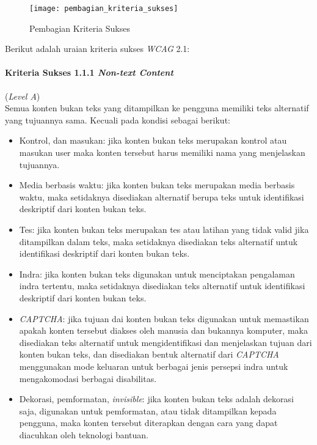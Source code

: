 \begin{figure}[H]
	\centering  
	\texttt{[image: pembagian\_kriteria\_sukses]}  
	\caption[Pembagian Kriteria Sukses]{Pembagian Kriteria Sukses} 
	\label{fig:pembagian_kriteria_sukses} 
\end{figure}

Berikut adalah uraian kriteria sukses \textit{WCAG} 2.1:

\paragraph{Kriteria Sukses 1.1.1 \textit{Non-text Content}}
\label{subsec:kriteria_1.1.1}
(\textit{Level A})\\

Semua konten bukan teks yang ditampilkan ke pengguna memiliki teks alternatif yang tujuannya sama. Kecuali pada kondisi sebagai berikut:

\begin{itemize}
	\item Kontrol, dan masukan: jika konten bukan teks merupakan kontrol atau masukan user maka konten tersebut harus memiliki nama yang menjelaskan tujuannya.
	\item Media berbasis waktu: jika konten bukan teks merupakan media berbasis waktu, maka setidaknya disediakan alternatif berupa teks untuk identifikasi deskriptif dari konten bukan teks.
	\item Tes: jika konten bukan teks merupakan tes atau latihan yang tidak valid jika ditampilkan dalam teks, maka setidaknya disediakan teks alternatif untuk identifikasi deskriptif dari konten bukan teks.
	\item Indra: jika konten bukan teks digunakan untuk menciptakan pengalaman indra tertentu, maka setidaknya disediakan teks alternatif untuk identifikasi deskriptif dari konten bukan teks.
	\item \textit{CAPTCHA}: jika tujuan dai konten bukan teks digunakan untuk memastikan apakah konten tersebut diakses oleh manusia dan bukannya komputer, maka disediakan teks alternatif untuk mengidentifikasi dan menjelaskan tujuan dari konten bukan teks, dan disediakan bentuk alternatif dari \textit{CAPTCHA} menggunakan mode keluaran untuk berbagai jenis persepsi indra untuk mengakomodasi berbagai disabilitas.
	\item Dekorasi, pemformatan, \textit{invisible}: jika konten bukan teks adalah dekorasi saja, digunakan untuk pemformatan, atau tidak ditampilkan kepada pengguna, maka konten tersebut diterapkan dengan cara yang dapat diacuhkan oleh teknologi bantuan.
\end{itemize} 

